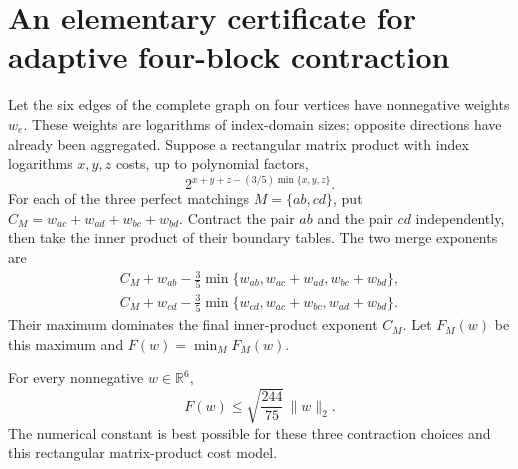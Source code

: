 \section{An elementary certificate for adaptive four-block contraction}
\label{sec:k4-elementary-certificate}

Let the six edges of the complete graph on four vertices have nonnegative
weights $w_e$. These weights are logarithms of index-domain sizes; opposite
directions have already been aggregated. Suppose a rectangular matrix product
with index logarithms $x,y,z$ costs, up to polynomial factors,
\[
 2^{x+y+z-(3/5)\min\{x,y,z\}}.
\]
For each of the three perfect matchings $M=\{ab,cd\}$, put
$C_M=w_{ac}+w_{ad}+w_{bc}+w_{bd}$. Contract the pair $ab$ and the pair $cd$
independently, then take the inner product of their boundary tables.
The two merge exponents are
\begin{align*}
 C_M+w_{ab}-\tfrac35\min\{w_{ab},w_{ac}+w_{ad},w_{bc}+w_{bd}\},\\
 C_M+w_{cd}-\tfrac35\min\{w_{cd},w_{ac}+w_{bc},w_{ad}+w_{bd}\}.
\end{align*}
Their maximum dominates the final inner-product exponent $C_M$.
Let $F_M(w)$ be this maximum and $F(w)=\min_M F_M(w)$.

\begin{theorem}
\label{thm:k4-euclidean}
For every nonnegative $w\in\mathbb R^6$,
\[
 F(w)\le\sqrt{\frac{244}{75}}\,\|w\|_2.
\]
The numerical constant is best possible for these three contraction choices
and this rectangular matrix-product cost model.
\end{theorem}

